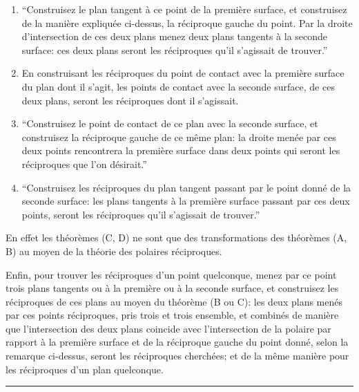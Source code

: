 \documentclass[11pt,a4paper]{article}
\theoremstyle{definition}
\begin{document}
\begin{enumerate}[label=(\Alph*)]
\item ``Construisez le plan tangent \`{a} ce point de la premi\`{e}re surface, et construisez de la mani\`{e}re expliqu\'{e}e ci-dessus, la r\'{e}ciproque gauche du point. Par la droite d'intersection de ces deux plans menez deux plans tangents \`{a} la seconde surface: ces deux plans seront les r\'{e}ciproques qu'il s'agissait de trouver.''

\item En construisant les r\'{e}ciproques du point de contact avec la premi\`{e}re surface du plan dont il s'agit, les points de contact avec la seconde surface, de ces deux plans, seront les r\'{e}ciproques dont il s'agissait.

\item ``Construisez le point de contact de ce plan avec la seconde surface, et construisez la r\'{e}ciproque gauche de ce m\^{e}me plan: la droite men\'{e}e par ces deux points rencontrera la premi\`{e}re surface dans deux points qui seront les r\'{e}ciproques que l'on d\'{e}sirait.''

\item ``Construisez les r\'{e}ciproques du plan tangent passant par le point donn\'{e} de la seconde surface: les plans tangents \`{a} la premi\`{e}re surface passant par ces deux points, seront les r\'{e}ciproques qu'il s'agissait de trouver.''
\end{enumerate}

En effet les th\'{e}or\`{e}mes (C, D) ne sont que des transformations des th\'{e}or\`{e}mes (A, B) au moyen de la th\'{e}orie des polaires r\'{e}ciproques.

Enfin, pour trouver les r\'{e}ciproques d'un point quelconque, menez par ce point trois plans tangents ou \`{a} la premi\`{e}re ou \`{a} la seconde surface, et construisez les r\'{e}ciproques de ces plans au moyen du th\'{e}or\`{e}me (B ou C): les deux plans men\'{e}s par ces points r\'{e}ciproques, pris trois et trois ensemble, et combin\'{e}s de mani\`{e}re que l'intersection des deux plans coincide avec l'intersection de la polaire par rapport \`{a} la premi\`{e}re surface et de la r\'{e}ciproque gauche du point donn\'{e}, selon la remarque ci-dessus, seront les r\'{e}ciproques cherch\'{e}es; et de la m\^{e}me mani\`{e}re pour les r\'{e}ciproques d'un plan quelconque.

\vspace{0.5em}
\noindent\rule{0.3\textwidth}{0.4pt}
\end{document}

